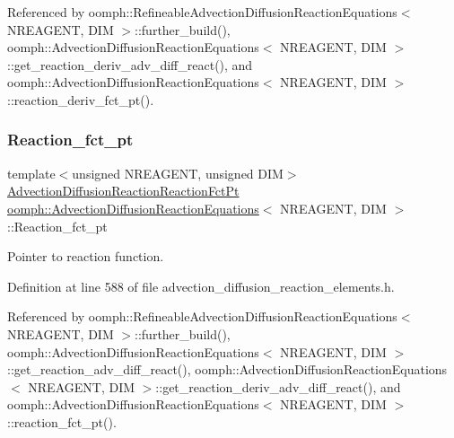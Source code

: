 Referenced by oomph\+::\+Refineable\+Advection\+Diffusion\+Reaction\+Equations$<$ N\+R\+E\+A\+G\+E\+N\+T, D\+I\+M $>$\+::further\+\_\+build(), oomph\+::\+Advection\+Diffusion\+Reaction\+Equations$<$ N\+R\+E\+A\+G\+E\+N\+T, D\+I\+M $>$\+::get\+\_\+reaction\+\_\+deriv\+\_\+adv\+\_\+diff\+\_\+react(), and oomph\+::\+Advection\+Diffusion\+Reaction\+Equations$<$ N\+R\+E\+A\+G\+E\+N\+T, D\+I\+M $>$\+::reaction\+\_\+deriv\+\_\+fct\+\_\+pt().

\mbox{\label{classoomph_1_1AdvectionDiffusionReactionEquations_ae0232ca6f0b4cf18afbd893ec289f097}} 
\subsubsection{\texorpdfstring{Reaction\+\_\+fct\+\_\+pt}{Reaction\_fct\_pt}}
{\footnotesize\ttfamily template$<$unsigned N\+R\+E\+A\+G\+E\+NT, unsigned D\+IM$>$ \\
\hyperlink{classoomph_1_1AdvectionDiffusionReactionEquations_a74f8f0492147a5600b075cc64479f850}{Advection\+Diffusion\+Reaction\+Reaction\+Fct\+Pt} \hyperlink{classoomph_1_1AdvectionDiffusionReactionEquations}{oomph\+::\+Advection\+Diffusion\+Reaction\+Equations}$<$ N\+R\+E\+A\+G\+E\+NT, D\+IM $>$\+::Reaction\+\_\+fct\+\_\+pt\hspace{0.3cm}{\ttfamily [protected]}}



Pointer to reaction function. 



Definition at line 588 of file advection\+\_\+diffusion\+\_\+reaction\+\_\+elements.\+h.



Referenced by oomph\+::\+Refineable\+Advection\+Diffusion\+Reaction\+Equations$<$ N\+R\+E\+A\+G\+E\+N\+T, D\+I\+M $>$\+::further\+\_\+build(), oomph\+::\+Advection\+Diffusion\+Reaction\+Equations$<$ N\+R\+E\+A\+G\+E\+N\+T, D\+I\+M $>$\+::get\+\_\+reaction\+\_\+adv\+\_\+diff\+\_\+react(), oomph\+::\+Advection\+Diffusion\+Reaction\+Equations$<$ N\+R\+E\+A\+G\+E\+N\+T, D\+I\+M $>$\+::get\+\_\+reaction\+\_\+deriv\+\_\+adv\+\_\+diff\+\_\+react(), and oomph\+::\+Advection\+Diffusion\+Reaction\+Equations$<$ N\+R\+E\+A\+G\+E\+N\+T, D\+I\+M $>$\+::reaction\+\_\+fct\+\_\+pt().

